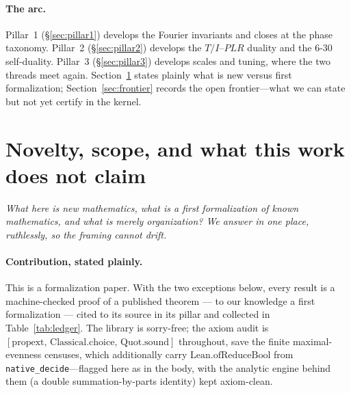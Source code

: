 \documentclass[11pt]{article}
\newcommand{\lean}[1]{\texttt{#1}}
\newcommand{\question}[1]{\smallskip\noindent\textit{#1}\smallskip}
\begin{document}
\paragraph{The arc.} Pillar~1 (\S\ref{sec:pillar1}) develops the Fourier invariants and closes
at the phase taxonomy. Pillar~2 (\S\ref{sec:pillar2}) develops the $T/I$--$PLR$ duality and the
$6$-$30$ self-duality. Pillar~3 (\S\ref{sec:pillar3}) develops scales and tuning, where the two
threads meet again. Section~\ref{sec:novelty} states plainly what is new versus first
formalization; Section~\ref{sec:frontier} records the open frontier---what we can state but not
yet certify in the kernel.


\section{Novelty, scope, and what this work does not claim}\label{sec:novelty}

\question{What here is new mathematics, what is a first formalization of known mathematics, and
what is merely organization? We answer in one place, ruthlessly, so the framing cannot drift.}

\paragraph{Contribution, stated plainly.} This is a formalization paper. With the two exceptions
below, every result is a machine-checked proof of a published theorem --- to our knowledge a first
formalization --- cited to its source
in its pillar and collected in Table~\ref{tab:ledger}. The library is sorry-free; the axiom
audit is $[\mathrm{propext},\,\mathrm{Classical.choice},\,\mathrm{Quot.sound}]$ throughout, save
the finite maximal-evenness censuses, which additionally carry $\mathrm{Lean.ofReduceBool}$ from
\lean{native\_decide}---flagged here as in the body, with the analytic engine behind them
(a double summation-by-parts identity) kept axiom-clean.
\end{document}
